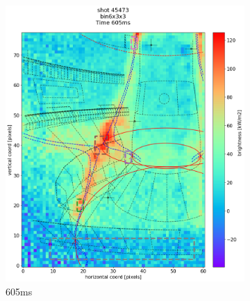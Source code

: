 \begin{figure}
\begin{subfigure}{0.355\linewidth}
         \includegraphics[trim={50 45 25 80},clip,width=\textwidth]{Chapters/chapter2/figs/IRVB-MASTU_shot-45473_export_36.png}
         \vspace*{-6.5mm}
         \caption{605ms}
         \label{fig:45473_export_3}
     \end{subfigure}
     \begin{subfigure}{0.355\linewidth}
         \centering

\end{subfigure}
\end{figure}
